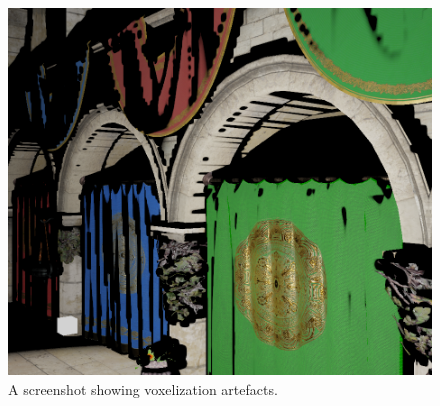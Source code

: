 \documentclass[]{acmsiggraph}
\begin{document}
\begin{figure}[htbp]\centering
 \includegraphics[width=1.0\linewidth]{images/voxelization_error.png}
 \caption{\label{fig:reference}A screenshot showing voxelization artefacts.}
\end{figure}



\end{document}
